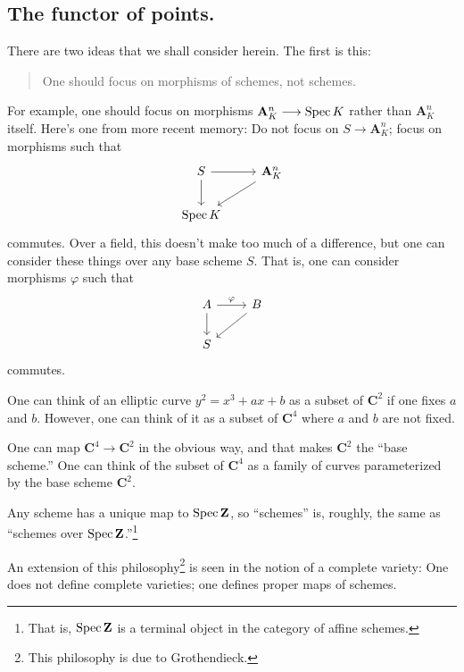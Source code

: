\documentclass [11 pt, oneside] {article}
\begin{document}
\subsection{The functor of points.}
There are two ideas that we shall consider herein. The first is this:
\begin{quote}
	\small 
	One should focus on morphisms of schemes, not schemes.
\end{quote}
For example, one should focus on morphisms $\mathbf{A}^n_K\longrightarrow \operatorname{Spec} K$ rather than $\mathbf{A}^n_K$ itself. Here's one from more recent memory: Do not focus on $S\longrightarrow \mathbf{A}^n_K$; focus on morphisms such that
\[
\begin{tikzcd}
	S\ar[d] \ar[r] &\mathbf{A}^n_K\ar[dl]\\
	\Spec K
\end{tikzcd}
\]
commutes. Over a field, this doesn't make too much of a difference, but one can consider these things over any base scheme $S$. That is, one can consider morphisms $\varphi$ such that
\[
\begin{tikzcd}
	 A\ar[r,"\varphi"]\ar[d]&B\ar[dl]\\
        S
\end{tikzcd}
\]
commutes.

\begin{example}[ ]\label{}\text{}
One can think of an elliptic curve $y^2 = x^3+ax+b$ as a subset of $\mathbf{C}^2$ if one fixes $a$ and $b$. However, one can think of it as a subset of $\mathbf{C}^4$ where $a$ and $b$ are not fixed.

One can map $\mathbf{C}^4\longrightarrow \mathbf{C}^2$ in the obvious way, and that makes $\mathbf{C}^2$ the ``base scheme.'' One can think of the subset of $\mathbf{C}^4$ as a family of curves parameterized by the base scheme $\mathbf{C}^2$.
\end{example}

\begin{remark}
	Any scheme has a unique map to $\operatorname{Spec} \mathbf{Z}$, so ``schemes'' is, roughly, the same as ``schemes over $\operatorname{Spec} \mathbf{Z}$.''\footnote{That is, $\operatorname{Spec} \mathbf{Z}$ is a terminal object in the category of affine schemes.}
\end{remark}

An extension of this philosophy\footnote{This philosophy is due to Grothendieck.} is seen in the notion of a complete variety: One does not define complete varieties; one defines proper maps of schemes.
\end{document}
